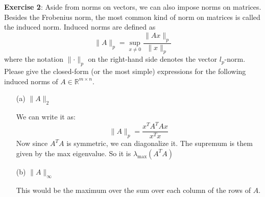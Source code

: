 \documentclass{article}
\begin{document}
\textbf{Exercise 2}: Aside from norms on vectors, we can also impose norms on matrices. Besides the Frobenius norm, the most common kind of norm on matrices is called the induced norm. Induced norms are defined as
    \begin{equation*}
        \lVert A \rVert_{p} = \sup_{x \neq 0} \dfrac{\lVert Ax \rVert_{p}}{\lVert x \rVert_{p}}
    \end{equation*}
where the notation $\lVert \cdot \rVert_{p}$ on the right-hand side denotes the vector $l_{p}$-norm. Please give the closed-form (or the most simple) expressions for the following induced norms of $A \in \mathbb{R}^{m \times n}$.
    \begin{itemize}
        \item [(a)] $\lVert A \rVert_{2}$
            \begin{answer}
                We can write it as:
                    \begin{equation*}
                        \lVert A \rVert_{p} = \dfrac{x^{T}A^{T}Ax}{x^{T}x}
                    \end{equation*}
                Now since $A^{T}A$ is symmetric, we can diagonalize it. The supremum is them given by the max eigenvalue. So it is $\lambda_{\max}(A^{T}A)$
            \end{answer}

        \item [(b)] $\lVert A \rVert_{\infty}$ 
            \begin{answer}
                This would be the maximum over the sum over each column of the rows of $A$.
            \end{answer}
    \end{itemize}
\end{document}
